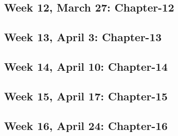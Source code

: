 \documentclass[]{article}
\begin{document}
\hypertarget{week-12-march-27-chapter-12}{%
\subsection{Week 12, March 27:
Chapter-12}\label{week-12-march-27-chapter-12}}

\hypertarget{week-13-april-3-chapter-13}{%
\subsection{Week 13, April 3:
Chapter-13}\label{week-13-april-3-chapter-13}}

\hypertarget{week-14-april-10-chapter-14}{%
\subsection{Week 14, April 10:
Chapter-14}\label{week-14-april-10-chapter-14}}

\hypertarget{week-15-april-17-chapter-15}{%
\subsection{Week 15, April 17:
Chapter-15}\label{week-15-april-17-chapter-15}}

\hypertarget{week-16-april-24-chapter-16}{%
\subsection{Week 16, April 24:
Chapter-16}\label{week-16-april-24-chapter-16}}
\end{document}

